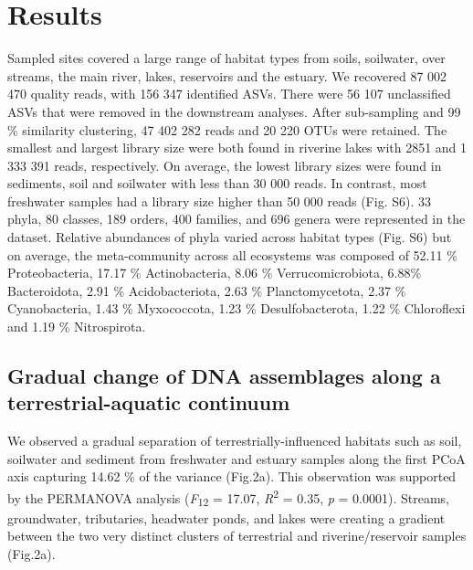 \documentclass[12pt,a4paper]{article} %
\begin{document}
\section*{Results}
Sampled sites covered a large range of habitat types from soils, soilwater, over streams, the main river, lakes, reservoirs and the estuary. We recovered 87 002 470 quality reads, with 156 347 identified ASVs. There were 56 107 unclassified ASVs that were removed in the downstream analyses. After sub-sampling and 99 \% similarity clustering, 47 402 282 reads and 20 220 OTUs were retained. The smallest and largest library size were both found in riverine lakes with 2851 and 1 333 391 reads, respectively. On average, the lowest library sizes were found in sediments, soil and soilwater with less than 30 000 reads. In contrast, most freshwater samples had a library size higher than 50 000 reads (Fig. S6). 33 phyla, 80 classes,  189 orders, 400 families, and 696 genera were represented in the dataset. Relative abundances of phyla varied across habitat types (Fig. S6) but on average, the meta-community across all ecosystems was composed of 52.11 \% Proteobacteria, 17.17 \% Actinobacteria, 8.06 \% Verrucomicrobiota, 6.88\% Bacteroidota, 2.91 \% Acidobacteriota, 2.63 \% Planctomycetota, 2.37 \% Cyanobacteria, 1.43 \% Myxococcota, 1.23 \% Desulfobacterota, 1.22 \% Chloroflexi and 1.19 \% Nitrospirota.

\subsection*{Gradual change of DNA assemblages along a terrestrial-aquatic continuum}
We observed a gradual separation of terrestrially-influenced habitats such as soil, soilwater and sediment from freshwater and estuary samples along the first PCoA axis capturing 14.62 \% of the variance (Fig.2a). This observation was supported by the PERMANOVA analysis (\textit{F}\textsubscript{12} = 17.07, \textit{R}\textsuperscript{2} = 0.35, \textit{p} = 0.0001). Streams, groundwater, tributaries, headwater ponds, and lakes were creating a gradient between the two very distinct clusters of terrestrial and riverine/reservoir samples (Fig.2a).
\end{document}
